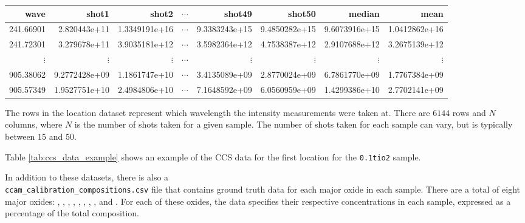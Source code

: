 \begin{table*}[!b]
\centering
\begin{tabular}{rrrrrrrr}
\toprule
     wave &         shot1 &         shot2 &  $\cdots$ &        shot49 &       shot50  & median        & mean          \\
\midrule
241.66901 & 2.820443e+11  & 1.3349191e+16 & $\cdots$  & 9.3383243e+15 & 9.4850282e+15 & 9.6073916e+15 & 1.0412862e+16 \\
241.72301 & 3.279678e+11  & 3.9035181e+12 & $\cdots$  & 3.5982364e+12 & 4.7538387e+12 & 2.9107688e+12 & 3.2675139e+12 \\
$\vdots$  & $\vdots$      & $\vdots$      & $\cdots$  & $\vdots$      & $\vdots$      & $\vdots$      & $\vdots$      \\
905.38062 & 9.2772428e+09 & 1.1861747e+10 & $\cdots$  & 3.4135089e+09 & 2.8770024e+09 & 6.7861770e+09 & 1.7767384e+09 \\
905.57349 & 1.9527751e+10 & 2.4984806e+10 & $\cdots$  & 7.1648592e+09 & 6.0560959e+09 & 1.4299386e+10 & 2.7702141e+09 \\
\bottomrule
\end{tabular}
\caption{Example of CCS data for the first sample in the \texttt{0.1tio2} directory.}
\label{tab:ccs_data_example}
\end{table*}

The rows in the location dataset represent which wavelength the intensity measurements were taken at.
There are $6144$ rows and $N$ columns, where $N$ is the number of shots taken for a given sample.
The number of shots taken for each sample can vary, but is typically between $15$ and $50$.

Table \ref{tab:ccs_data_example} shows an example of the CCS data for the first location for the \texttt{0.1tio2} sample.

In addition to these datasets, there is also a \\ \texttt{ccam\_calibration\_compositions.csv} file that contains ground truth data for each major oxide in each sample.
There are a total of eight major oxides: , , , , , , , , and .
For each of these oxides, the data specifies their respective concentrations in each sample, expressed as a percentage of the total composition.